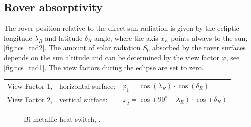 \subsection{Rover absorptivity} \label{sec:app_therm_4}
The rover position relative to the direct sun radiation is given by the ecliptic longitude $\lambda_R$ and latitude $\delta_R$ angle, where the axis $x_E$ points always to the sun, \autoref{fig:tcs_rad2}.
The amount of solar radiation $S_0$ absorbed by the rover surfaces depends on the sun altitude and can be determined by the view factor $\varphi$, see \autoref{fig:tcs_rad1}.
The view factors during the eclipse are set to zero.

\begin{table}[H]
	\begin{tabular}{l@{\qquad}ll}
		View Factor 1,& horizontal surface:& $ \varphi_1=\cos (\lambda_R) \cdot \cos (\delta_R)  $ \\
		View Factor 2, & vertical surface: &$ \varphi_2=\cos (90^{\circ}-\lambda_R) \cdot \cos (\delta_R)  $\\
	\end{tabular}
\end{table}

\begin{figure}[h]
	\centering
	\qquad\qquad
	\caption{Bi-metallic heat switch, \cite{ref_tcs_04}.}
	\label{fig:tcs_rad}
\end{figure}



